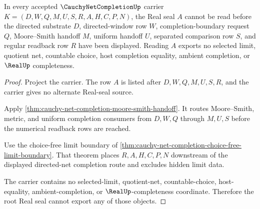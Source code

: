 \begin{theorem}
\label{thm:cauchy-net-completion-root-seal-nonescape}
In every accepted $\CauchyNetCompletionUp$ carrier $K=(D,W,Q,M,U,S,R,A,H,C,P,N)$, the Real seal $A$ cannot be read before the directed substrate $D$, directed-window row $W$, completion-boundary request $Q$, Moore--Smith handoff $M$, uniform handoff $U$, separated comparison row $S$, and regular readback row $R$ have been displayed. Reading $A$ exports no selected limit, quotient net, countable choice, host completion equality, ambient completion, or $\RealUp$ completeness.
\end{theorem}
\begin{proof}
Project the carrier. The row $A$ is listed after $D,W,Q,M,U,S,R$, and the carrier gives no alternate Real-seal source.

Apply \autoref{thm:cauchy-net-completion-moore-smith-handoff}. It routes Moore--Smith, metric, and uniform completion consumers from $D,W,Q$ through $M,U,S$ before the numerical readback rows are reached.

Use the choice-free limit boundary of \autoref{thm:cauchy-net-completion-choice-free-limit-boundary}. That theorem places $R,A,H,C,P,N$ downstream of the displayed directed-net completion route and excludes hidden limit data.

The carrier contains no selected-limit, quotient-net, countable-choice, host-equality, ambient-completion, or $\RealUp$-completeness coordinate. Therefore the root Real seal cannot export any of those objects.
\end{proof}



